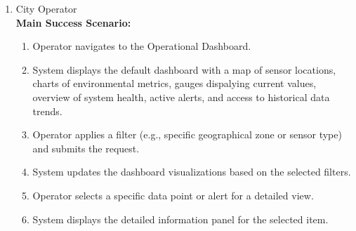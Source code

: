 {\begin{enumerate}[{\bf BE1.}]
\begin{enumerate}[{\bf VP1.}]
            {\bf Secondary Scenario:}
            \begin{itemize}
                \item[] {3i.} System finds no data matching the selected filters.
                \begin{itemize}
                    \item[] {3i.1.} System queries the database but finds no matching records.
                    \item[] {3i.2.} System displays a "No Data Found" message in the visualization widgets and prompts the Administrator to adjust the filters.
                \end{itemize}
            \end{itemize}
        \item City Operator \\
            {\bf Main Success Scenario:}
                \begin{enumerate}[1. ]
                    \item Operator navigates to the Operational Dashboard.
                    \item System displays the default dashboard with a map of sensor locations, charts of environmental metrics, gauges dispalying current values, overview of system health, active alerts, and access to historical data trends.
                    \item Operator applies a filter (e.g., specific geographical zone or sensor type) and submits the request.
                    \item System updates the dashboard visualizations based on the selected filters.
                    \item Operator selects a specific data point or alert for a detailed view.
                    \item System displays the detailed information panel for the selected item.
                \end{enumerate}


\end{enumerate}
\end{enumerate}}
